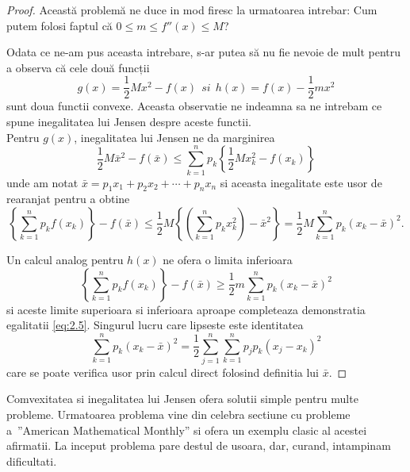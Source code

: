 \documentclass[a4paper,12pt,oneside]{report}
\begin{document}
\begin{proof}
Această problemă ne duce in mod firesc la urmatoarea intrebar: Cum putem folosi faptul că \(0\leq m\leq {f}''\left ( x \right )\leq M \)?

Odata ce ne-am pus aceasta intrebare, s-ar putea să nu fie nevoie de mult pentru a observa că cele două funcții
\begin{displaymath}
  g\left ( x \right ) = \frac{1}{2}Mx^{2} - f\left ( x \right )~~ si~~
h\left ( x \right ) = f\left ( x \right ) - \frac{1}{2}mx^{2}
\end{displaymath}
sunt doua functii convexe.
Aceasta observatie ne indeamna sa ne intrebam ce spune inegalitatea lui Jensen despre aceste functii.\\
Pentru \(g\left ( x \right )\), inegalitatea lui Jensen ne da marginirea
\begin{displaymath}
  \frac{1}{2}M\bar{x}^{2} - f\left ( \bar{x} \right )\leq \sum_{k = 1}^{n}p_{k}\left \{ \frac{1}{2}Mx_{k}^{2} - f\left ( x_{k} \right )\right \}
\end{displaymath}
unde am notat \(\bar{x} = p_{1}x_{1}+ p_{2}x_{2}+ \cdots + p_{n}x_{n}\) si aceasta inegalitate este usor de rearanjat  pentru a obtine
\begin{displaymath}
  \left \{ \sum_{k = 1}^{n} p_{k}f\left ( x_{k} \right )\right \} - f\left (\bar{x}  \right )\leq \frac{1}{2}M\left \{ \left ( \sum_{k=1}^{n} p_{k}x_{k}^{2}\right ) - \bar{x}^{2} \right \} = \frac{1}{2}M\sum_{k = 1}^{n}p_{k}\left ( x_{k} - \bar{x} \right )^{2}.
\end{displaymath}

Un calcul analog pentru  \(h\left ( x \right )\) ne ofera o limita inferioara
\begin{displaymath}
  \left \{ \sum_{k = 1}^{n} p_{k}f\left ( x_{k} \right )\right \} - f\left (\bar{x}  \right )\geq \frac{1}{2}m\sum_{k = 1}^{n}p_{k}\left ( x_{k} - \bar{x} \right )^{2}
\end{displaymath}
si aceste limite superioara si inferioara aproape completeaza demonstratia egalitatii  \ref{eq:2.5}. Singurul lucru care lipseste este identitatea
\begin{displaymath}
  \sum_{k = 1}^{n}p_{k}\left ( x_{k} - \bar{x} \right )^{2} = \frac{1}{2}\sum_{j = 1}^{n}\sum_{k = 1}^{n} p _{j}p_{k}\left ( x_{j} - x_{k} \right )^{2}
\end{displaymath}
care se poate verifica usor prin calcul direct folosind definitia lui \(\bar{x}\).
\end{proof}
Comvexitatea si inegalitatea lui Jensen ofera solutii simple pentru multe probleme.
	Urmatoarea problema vine din celebra sectiune cu probleme a ”American Mathematical Monthly” si ofera un exemplu clasic al acestei afirmatii.
	La inceput problema pare destul de usoara, dar, curand, intampinam dificultati.
\end{document}
